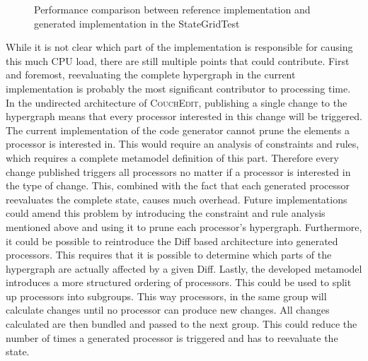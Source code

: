 \begin{figure}
  \centering
  \caption{Performance comparison between reference implementation and generated implementation in the StateGridTest}
  \label{fig:performance}
\end{figure}

While it is not clear which part of the implementation is responsible for causing this much CPU load, there are still multiple points that could contribute. First and foremost, reevaluating the complete hypergraph in the current implementation is probably the most significant contributor to processing time. In the undirected architecture of \textsc{CouchEdit}, publishing a single change to the hypergraph means that every processor interested in this change will be triggered. The current implementation of the code generator cannot prune the elements a processor is interested in.  This would require an analysis of constraints and rules, which requires a complete metamodel definition of this part. Therefore every change published triggers all processors no matter if a processor is interested in the type of change. This, combined with the fact that each generated processor reevaluates the complete state, causes much overhead. Future implementations could amend this problem by introducing the constraint and rule analysis mentioned above and using it to prune each processor's hypergraph. Furthermore, it could be possible to reintroduce the Diff based architecture into generated processors. This requires that it is possible to determine which parts of the hypergraph are actually affected by a given Diff. Lastly, the developed metamodel introduces a more structured ordering of processors. This could be used to split up processors into subgroups. This way processors, in the same group will calculate changes until no processor can produce new changes. All changes calculated are then bundled and passed to the next group. This could reduce the number of times a generated processor is triggered and has to reevaluate the state.

